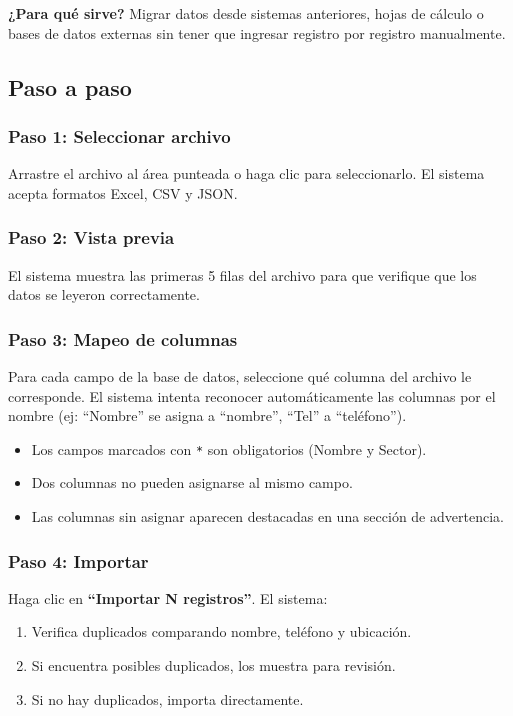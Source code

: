 \documentclass[12pt]{article}
\begin{document}
\begin{infobox}
  \textbf{¿Para qué sirve?} Migrar datos desde sistemas anteriores, hojas de cálculo o bases de datos externas sin tener que ingresar registro por registro manualmente.
\end{infobox}

\subsection{Paso a paso}

\subsubsection{Paso 1: Seleccionar archivo}
Arrastre el archivo al área punteada o haga clic para seleccionarlo. El sistema acepta formatos Excel, CSV y JSON.

\subsubsection{Paso 2: Vista previa}
El sistema muestra las primeras 5 filas del archivo para que verifique que los datos se leyeron correctamente.

\subsubsection{Paso 3: Mapeo de columnas}
Para cada campo de la base de datos, seleccione qué columna del archivo le corresponde. El sistema intenta reconocer automáticamente las columnas por el nombre (ej: ``Nombre'' se asigna a ``nombre'', ``Tel'' a ``teléfono'').

\begin{itemize}[nosep]
  \item Los campos marcados con \texttt{*} son obligatorios (Nombre y Sector).
  \item Dos columnas no pueden asignarse al mismo campo.
  \item Las columnas sin asignar aparecen destacadas en una sección de advertencia.
\end{itemize}

\subsubsection{Paso 4: Importar}
Haga clic en \textbf{``Importar N registros''}. El sistema:

\begin{enumerate}[nosep]
  \item Verifica duplicados comparando nombre, teléfono y ubicación.
  \item Si encuentra posibles duplicados, los muestra para revisión.
  \item Si no hay duplicados, importa directamente.
\end{enumerate}
\end{document}
